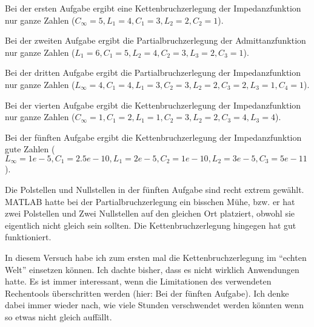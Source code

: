 \documentclass[notitlepage]{fhnwreport/fhnwreport}
\begin{document}
Bei der ersten  Aufgabe  ergibt eine Kettenbruchzerlegung der Impedanzfunktion
nur ganze Zahlen ($C_{\infty}=5, L_1=4, C_1=3, L_2=2, C_2=1$).

Bei der zweiten Aufgabe ergibt die Partialbruchzerlegung der Admittanzfunktion
nur ganze Zahlen ($L_1=6, C_1=5, L_2=4, C_2=3, L_3=2, C_3=1$).

Bei der dritten  Aufgabe ergibt die Partialbruchzerlegung der Impedanzfunktion
nur ganze  Zahlen  ($L_{\infty}=4,  C_1=4,  L_1=3, C_2=3, L_2=2, C_3=2, L_3=1,
C_4=1$).

Bei  der vierten Aufgabe ergibt die Kettenbruchzerlegung der  Impedanzfunktion
nur ganze Zahlen ($C_{\infty}=1,  C_1=2,  L_1=1, C_2=3, L_2=2, C_3=4, L_3=4$).

Bei der f\"unften Aufgabe ergibt die Kettenbruchzerlegung der Impedanzfunktion
gute Zahlen ($L_{\infty}=1e-5,  C_1=2.5e-10,  L_1=2e-5,  C_2=1e-10,  L_2=3e-5,
C_3=5e-11$).

Die Polstellen und Nullstellen in der  f\"unften  Aufgabe  sind  recht  extrem
gew\"ahlt.  MATLAB  hatte  bei der Partialbruchzerlegung ein bisschen  M\"uhe,
bzw.  er  hat  zwei  Polstellen und Zwei  Nullstellen  auf  den  gleichen  Ort
platziert,   obwohl   sie  eigentlich   nicht   gleich   sein   sollten.   Die
Kettenbruchzerlegung hingegen hat gut funktioniert.

In diesem Versuch habe ich zum ersten mal die Kettenbruchzerlegung im ``echten
Welt''  einsetzen  k\"onnen.  Ich  dachte  bisher,  dass  es   nicht  wirklich
Anwendungen  hatte.  Es  ist immer  interessant,  wenn  die  Limitationen  des
verwendeten  Rechentools  \"uberschritten  werden  (hier:  Bei  der  f\"unften
Aufgabe). Ich denke dabei  immer  wieder  nach, wie viele Stunden verschwendet
werden k\"onnten wenn so etwas nicht gleich auff\"allt.
\end{document}
